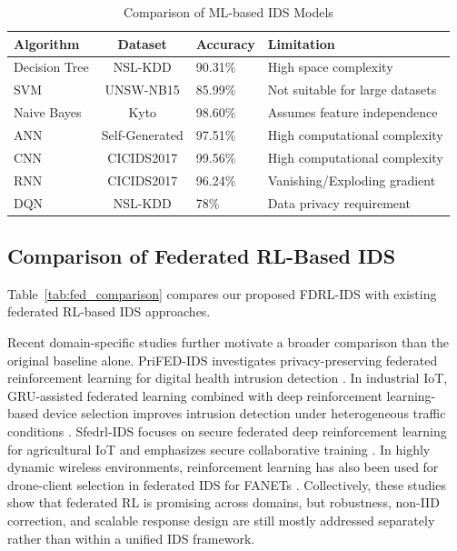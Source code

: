 \documentclass[conference]{IEEEtran}
\begin{document}
\begin{table}[htbp]
\caption{Comparison of ML-based IDS Models}
\label{tab:ml_comparison}
\centering
\begin{tabular}{lcll}
\toprule
\textbf{Algorithm} & \textbf{Dataset} & \textbf{Accuracy} & \textbf{Limitation} \\
\midrule
Decision Tree & NSL-KDD & 90.31\% & High space complexity \\
SVM & UNSW-NB15 & 85.99\% & Not suitable for large datasets \\
Naive Bayes & Kyto & 98.60\% & Assumes feature independence \\
ANN & Self-Generated & 97.51\% & High computational complexity \\
CNN & CICIDS2017 & 99.56\% & High computational complexity \\
RNN & CICIDS2017 & 96.24\% & Vanishing/Exploding gradient \\
DQN & NSL-KDD & 78\% & Data privacy requirement \\
\bottomrule
\end{tabular}
\end{table}

\subsection{Comparison of Federated RL-Based IDS}

Table~\ref{tab:fed_comparison} compares our proposed FDRL-IDS with existing federated RL-based IDS approaches.

Recent domain-specific studies further motivate a broader comparison than the original baseline alone. PriFED-IDS investigates privacy-preserving federated reinforcement learning for digital health intrusion detection \cite{prifed_ids}. In industrial IoT, GRU-assisted federated learning combined with deep reinforcement learning-based device selection improves intrusion detection under heterogeneous traffic conditions \cite{gru_fl}. Sfedrl-IDS focuses on secure federated deep reinforcement learning for agricultural IoT and emphasizes secure collaborative training \cite{sfedrl_ids}. In highly dynamic wireless environments, reinforcement learning has also been used for drone-client selection in federated IDS for FANETs \cite{fanet_rl}. Collectively, these studies show that federated RL is promising across domains, but robustness, non-IID correction, and scalable response design are still mostly addressed separately rather than within a unified IDS framework.
\end{document}
